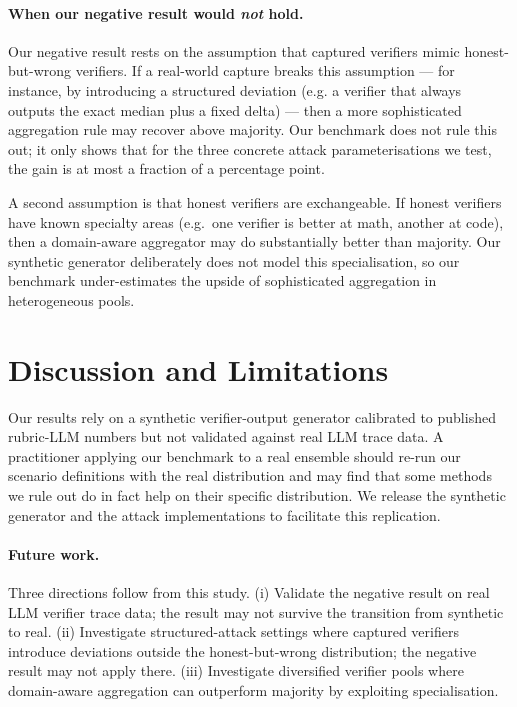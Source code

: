 \documentclass[11pt]{article}
\begin{document}
\paragraph{When our negative result would \emph{not} hold.}
Our negative result rests on the assumption that captured verifiers
mimic honest-but-wrong verifiers. If a real-world capture breaks this
assumption --- for instance, by introducing a structured deviation
(e.g. a verifier that always outputs the exact median plus a fixed
delta) --- then a more sophisticated aggregation rule may recover
above majority. Our benchmark does not rule this out; it only shows
that for the three concrete attack parameterisations we test, the
gain is at most a fraction of a percentage point.

A second assumption is that honest verifiers are exchangeable. If
honest verifiers have known specialty areas (e.g.\ one verifier is
better at math, another at code), then a domain-aware aggregator may
do substantially better than majority. Our synthetic generator
deliberately does not model this specialisation, so our benchmark
under-estimates the upside of sophisticated aggregation in
heterogeneous pools.

\section{Discussion and Limitations}
Our results rely on a synthetic verifier-output generator calibrated
to published rubric-LLM numbers but not validated against
real LLM trace data. A practitioner applying our benchmark to a real
ensemble should re-run our scenario definitions with the real
distribution and may find that some methods we rule out do in fact
help on their specific distribution. We release the synthetic
generator and the attack implementations to facilitate this
replication.

\paragraph{Future work.}
Three directions follow from this study.
(i) Validate the negative result on real LLM verifier trace data;
the result may not survive the transition from synthetic to real.
(ii) Investigate structured-attack settings where captured verifiers
introduce deviations outside the honest-but-wrong distribution; the
negative result may not apply there.
(iii) Investigate diversified verifier pools where domain-aware
aggregation can outperform majority by exploiting specialisation.
\end{document}
